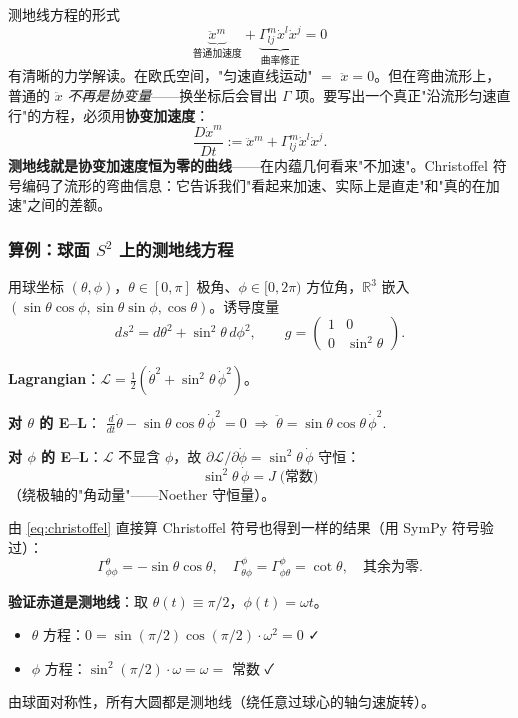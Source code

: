 \documentclass[11pt,a4paper]{article}
\theoremstyle{mythm}
\theoremstyle{mydef}
\newcommand{\R}{\mathbb{R}}
\begin{document}
测地线方程的形式
$$\underbrace{\ddot x^m}_{\text{普通加速度}} + \underbrace{\Gamma^m_{lj}\dot x^l\dot x^j}_{\text{曲率修正}} = 0$$
有清晰的力学解读。在欧氏空间，"匀速直线运动" $=$ $\ddot x = 0$。但在弯曲流形上，普通的 $\ddot x$ \emph{不再是协变量}——换坐标后会冒出 $\Gamma$ 项。要写出一个真正"沿流形匀速直行"的方程，必须用\textbf{协变加速度}：
$$\frac{D \dot x^m}{Dt} := \ddot x^m + \Gamma^m_{lj}\dot x^l\dot x^j.$$
\textbf{测地线就是协变加速度恒为零的曲线}——在内蕴几何看来"不加速"。Christoffel 符号编码了流形的弯曲信息：它告诉我们"看起来加速、实际上是直走"和"真的在加速"之间的差额。

\subsubsection*{算例：球面 $S^2$ 上的测地线方程}

用球坐标 $(\theta, \phi)$，$\theta\in[0,\pi]$ 极角、$\phi\in[0,2\pi)$ 方位角，$\R^3$ 嵌入 $(\sin\theta\cos\phi,\sin\theta\sin\phi,\cos\theta)$。诱导度量
$$ds^2 = d\theta^2 + \sin^2\theta\,d\phi^2,\qquad g = \begin{pmatrix}1 & 0\\ 0 & \sin^2\theta\end{pmatrix}.$$

\textbf{Lagrangian}：$\mathcal{L} = \tfrac{1}{2}(\dot\theta^2 + \sin^2\theta\,\dot\phi^2)$。

\textbf{对 $\theta$ 的 E--L}：
$\frac{d}{dt}\dot\theta - \sin\theta\cos\theta\,\dot\phi^2 = 0\;\Longrightarrow\;\boxed{\ddot\theta = \sin\theta\cos\theta\,\dot\phi^2}$.

\textbf{对 $\phi$ 的 E--L}：$\mathcal{L}$ 不显含 $\phi$，故 $\partial \mathcal{L}/\partial\dot\phi = \sin^2\theta\,\dot\phi$ 守恒：
$$\boxed{\sin^2\theta\,\dot\phi = J\;\text{(常数)}}$$
（绕极轴的"角动量"——Noether 守恒量）。

由 \eqref{eq:christoffel} 直接算 Christoffel 符号也得到一样的结果（用 SymPy 符号验过）：
$$\Gamma^\theta_{\phi\phi} = -\sin\theta\cos\theta,\quad \Gamma^\phi_{\theta\phi} = \Gamma^\phi_{\phi\theta} = \cot\theta,\quad\text{其余为零}.$$

\textbf{验证赤道是测地线}：取 $\theta(t)\equiv\pi/2$，$\phi(t) = \omega t$。
\begin{itemize}[leftmargin=2em]
\item $\theta$ 方程：$0 = \sin(\pi/2)\cos(\pi/2)\cdot\omega^2 = 0$ ✓
\item $\phi$ 方程：$\sin^2(\pi/2)\cdot\omega = \omega = $ 常数 ✓
\end{itemize}
由球面对称性，所有大圆都是测地线（绕任意过球心的轴匀速旋转）。
\end{document}
